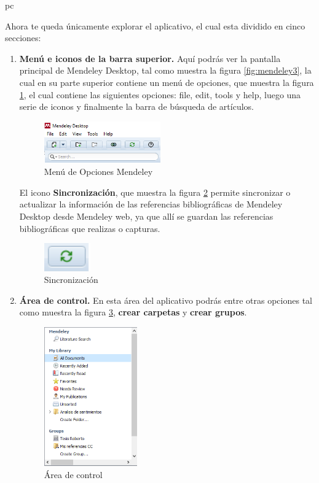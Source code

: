 pc\documentclass[a4paper,12pt,openany]{book}
\begin{document}
\begin{itemize}
\begin{itemize}
 Ahora te queda únicamente explorar el aplicativo, el cual esta dividido en cinco  secciones:

\begin{enumerate}
\item \textbf{Menú e iconos de la barra superior.} Aquí podrás ver la pantalla principal de Mendeley Desktop, tal como muestra la figura \ref{fig:mendeley3}, la cual en su parte superior contiene un  menú de opciones, que muestra la figura \ref{fig:mendeley4}, el cual contiene las siguientes opciones: file, edit, tools y help, luego una serie de iconos y finalmente la barra de búsqueda de artículos. 

\begin{figure}[H]
  \centering
	\includegraphics[width=5cm]{mendeley4.png}
\caption{Menú de Opciones Mendeley}
  \label{fig:mendeley4}
\end{figure}

El icono \textbf{Sincronización}, que muestra la figura \ref{fig:mendeley5} permite sincronizar o actualizar la información de las referencias bibliográficas de Mendeley Desktop desde Mendeley web, ya que allí se guardan las referencias bibliográficas que  realizas o capturas.  

\begin{figure}[H]
  \centering
	\includegraphics[width=2cm]{mendeley5.png}
\caption{Sincronización}
  \label{fig:mendeley5}
\end{figure}

\item \textbf{Área de control.} En esta área del aplicativo podrás entre otras opciones tal como muestra la figura \ref{fig:mendeley6}, \textbf{crear carpetas} y \textbf{crear grupos}.

\begin{figure}[H]
  \centering
	\includegraphics[width=4cm]{mendeley6.png}
\caption{Área de control}
  \label{fig:mendeley6}
\end{figure}


\end{enumerate}
\end{itemize}
\end{itemize}
\end{document}
